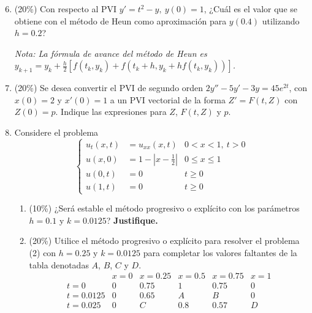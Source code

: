 \documentclass[11pt]{article}
\begin{document}
\begin{enumerate}
\setcounter{enumi}{5}
\item{} (20\%) Con respecto al PVI $y'=t^2-y,\ y(0)=1$, ¿Cuál es el valor que se obtiene con el método de Heun como aproximación para $y(0.4)$ utilizando $h=0.2$?

\vspace{4pt}
\noindent \textit{Nota: La fórmula de avance del método de Heun es $y_{k+1}=y_k+\frac{h}{2}\left[f(t_k,y_k)+f(t_k+h,y_k+hf(t_k,y_k))\right]$.}

\vspace{4cm}

\item{} (20\%) Se desea convertir el PVI de segundo orden $2y''-5y'-3y=45e^{2t}$, con $x(0)=2$ y $x'(0)=1$ a un PVI vectorial de la forma $Z'=F(t,Z)$ con $Z(0)=p$. Indique las expresiones para $Z$, $F(t,Z)$ y $p$.

\vspace{4cm}

\item{} Considere el problema
\[
\left\{
\begin{aligned}
u_t(x,t) &= u_{xx}(x,t) & 0<x<1,\ t>0\\
u(x,0) &= 1-\left|x-\tfrac{1}{2}\right| & 0\leq x\leq 1\\
u(0,t) &= 0 & t\geq 0\\
u(1,t) &= 0 & t\geq 0
\end{aligned}
\right.
\]
\begin{enumerate}
\item{} (10\%) ¿Será estable el método progresivo o explícito con los parámetros $h=0.1$ y $k=0.0125$? \textbf{Justifique.}

\vspace{4cm}

\item{} (20\%) Utilice el método progresivo o explícito para resolver el problema (2) con $h=0.25$ y $k=0.0125$ para completar los valores faltantes de la tabla denotadas $A$, $B$, $C$ y $D$.
\[
\begin{array}{c|ccccc}
 & x=0 & x=0.25 & x=0.5 & x=0.75 & x=1\\ \hline
t=0 & 0 & 0.75 & 1 & 0.75 & 0\\
t=0.0125 & 0 & 0.65 & A & B & 0\\
t=0.025 & 0 & C & 0.8 & 0.57 & D
\end{array}
\]

\vspace{4cm}
\end{enumerate}
\end{enumerate}

\examfooter
\end{document}
